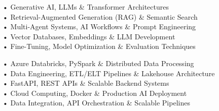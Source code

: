 \vspace{0.5em}

\begin{minipage}{0.48\textwidth}

\noindent • Generative AI, LLMs \& Transformer Architectures\\[0.2em]
\noindent • Retrieval-Augmented Generation (RAG) \& Semantic Search\\[0.2em]
\noindent • Multi-Agent Systems, AI Workflows \& Prompt Engineering\\[0.2em]
\noindent • Vector Databases, Embeddings \& LLM Development\\[0.2em]
\noindent • Fine-Tuning, Model Optimization \& Evaluation Techniques

\end{minipage}
\hfill
\begin{minipage}{0.48\textwidth}

\noindent • Azure Databricks, PySpark \& Distributed Data Processing\\[0.2em]
\noindent • Data Engineering, ETL/ELT Pipelines \& Lakehouse Architecture\\[0.2em]
\noindent • FastAPI, REST APIs \& Scalable Backend Systems\\[0.2em]
\noindent • Cloud Computing, Docker \& Production AI Deployment\\[0.2em]
\noindent • Data Integration, API Orchestration \& Scalable Pipelines

\end{minipage}

\vspace{0.3em}